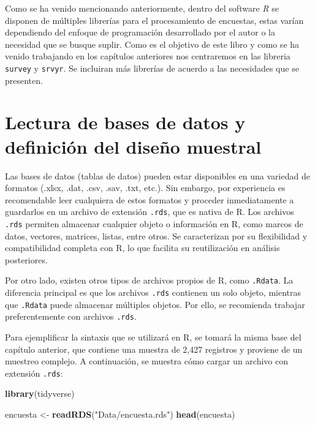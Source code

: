 \documentclass[
  12pt,
]{book}
\newenvironment{Shaded}{\begin{snugshade}}{\end{snugshade}}
\newcommand{\FunctionTok}[1]{\textcolor[rgb]{0.13,0.29,0.53}{\textbf{#1}}}
\newcommand{\NormalTok}[1]{#1}
\newcommand{\OtherTok}[1]{\textcolor[rgb]{0.56,0.35,0.01}{#1}}
\newcommand{\StringTok}[1]{\textcolor[rgb]{0.31,0.60,0.02}{#1}}
\begin{document}
Como se ha venido mencionando anteriormente, dentro del software \emph{R} se disponen de múltiples librerías para el procesamiento de encuestas, estas varían dependiendo del enfoque de programación desarrollado por el autor o la necesidad que se busque suplir. Como es el objetivo de este libro y como se ha venido trabajando en los capítulos anteriores nos centraremos en las libreria \texttt{survey} y \texttt{srvyr}. Se incluiran más librerías de acuerdo a las necesidades que se presenten.

\section{Lectura de bases de datos y definición del diseño muestral}\label{lectura-de-bases-de-datos-y-definiciuxf3n-del-diseuxf1o-muestral}

Las bases de datos (tablas de datos) pueden estar disponibles en una variedad de formatos (.xlsx, .dat, .csv, .sav, .txt, etc.). Sin embargo, por experiencia es recomendable leer cualquiera de estos formatos y proceder inmediatamente a guardarlos en un archivo de extensión \texttt{.rds}, que es nativa de R. Los archivos \texttt{.rds} permiten almacenar cualquier objeto o información en R, como marcos de datos, vectores, matrices, listas, entre otros. Se caracterizan por su flexibilidad y compatibilidad completa con R, lo que facilita su reutilización en análisis posteriores.

Por otro lado, existen otros tipos de archivos propios de R, como \texttt{.Rdata}. La diferencia principal es que los archivos \texttt{.rds} contienen un solo objeto, mientras que \texttt{.Rdata} puede almacenar múltiples objetos. Por ello, se recomienda trabajar preferentemente con archivos \texttt{.rds}.

Para ejemplificar la sintaxis que se utilizará en R, se tomará la misma base del capítulo anterior, que contiene una muestra de 2,427 registros y proviene de un muestreo complejo. A continuación, se muestra cómo cargar un archivo con extensión \texttt{.rds}:

\begin{Shaded}
\begin{Highlighting}[]
\FunctionTok{library}\NormalTok{(tidyverse)}

\NormalTok{encuesta }\OtherTok{\textless{}{-}} \FunctionTok{readRDS}\NormalTok{(}\StringTok{"Data/encuesta.rds"}\NormalTok{)}
\FunctionTok{head}\NormalTok{(encuesta)}
\end{Highlighting}
\end{Shaded}
\end{document}
